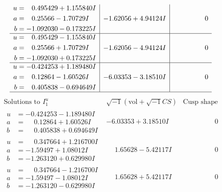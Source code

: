 \documentclass[1p]{elsarticle_modified}
\theoremstyle{definition}
\newcommand{\I}{\sqrt{-1}}
\begin{document}
$$\begin{array}{c|c|c}
\begin{aligned}
u &= \phantom{-}0.495429 + 1.155840 I \\
a &= \phantom{-}0.25566 - 1.70729 I \\
b &= -1.092030 - 0.173225 I\end{aligned}
 & -1.62056 + 4.94124 I & \phantom{-0.000000 } 0 \\ \hline\begin{aligned}
u &= \phantom{-}0.495429 - 1.155840 I \\
a &= \phantom{-}0.25566 + 1.70729 I \\
b &= -1.092030 + 0.173225 I\end{aligned}
 & -1.62056 - 4.94124 I & \phantom{-0.000000 } 0 \\ \hline\begin{aligned}
u &= -0.424253 + 1.189480 I \\
a &= \phantom{-}0.12864 - 1.60526 I \\
b &= \phantom{-}0.405838 - 0.694649 I\end{aligned}
 & -6.03353 - 3.18510 I & \phantom{-0.000000 } 0\\
 \hline 
 \end{array}$$\newpage$$\begin{array}{c|c|c}  
\text{Solutions to }I^u_{1}& \I (\text{vol} + \sqrt{-1}CS) & \text{Cusp shape}\\
 \hline 
\begin{aligned}
u &= -0.424253 - 1.189480 I \\
a &= \phantom{-}0.12864 + 1.60526 I \\
b &= \phantom{-}0.405838 + 0.694649 I\end{aligned}
 & -6.03353 + 3.18510 I & \phantom{-0.000000 } 0 \\ \hline\begin{aligned}
u &= \phantom{-}0.347664 + 1.216700 I \\
a &= -1.59497 + 1.08012 I \\
b &= -1.263120 + 0.629980 I\end{aligned}
 & \phantom{-}1.65628 - 5.42117 I & \phantom{-0.000000 } 0 \\ \hline\begin{aligned}
u &= \phantom{-}0.347664 - 1.216700 I \\
a &= -1.59497 - 1.08012 I \\
b &= -1.263120 - 0.629980 I\end{aligned}
 & \phantom{-}1.65628 + 5.42117 I & \phantom{-0.000000 } 0 \\ \hline\begin{aligned}

\end{aligned}
\end{array}$$
\end{document}
